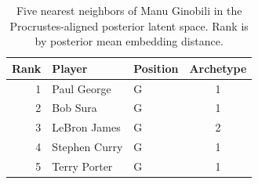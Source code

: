 \begin{table}[htbp]
  \centering\small
  \begin{tabular}{rllc}
    \toprule
    Rank & Player & Position & Archetype \\
    \midrule
    1 & Paul George & G & 1 \\
    2 & Bob Sura & G & 1 \\
    3 & LeBron James & G & 2 \\
    4 & Stephen Curry & G & 1 \\
    5 & Terry Porter & G & 1 \\
    \bottomrule
  \end{tabular}
  \caption{Five nearest neighbors of Manu Ginobili in the Procrustes-aligned posterior latent space. Rank is by posterior mean embedding distance.}
  \label{tab:Manu_Ginobili_neighbors}
\end{table}

